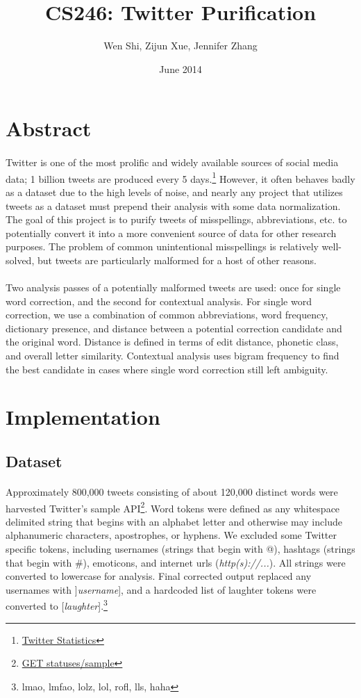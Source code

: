 \documentclass[twocolumn,10pt]{article}
\title{CS246: Twitter Purification}
\author{Wen Shi, Zijun Xue, Jennifer Zhang}
\date{June 2014}
\begin{document}
\maketitle


\section*{Abstract}
\paragraph{} Twitter is one of the most prolific and widely available sources of social media data; 1 billion tweets are produced every 5 days.\footnote{\href{http://http://www.statisticbrain.com/twitter-statistics/}{Twitter Statistics}} However, it often behaves badly as a dataset due to the high levels of noise, and nearly any project that utilizes tweets as a dataset must prepend their analysis with some data normalization. The goal of this project is to purify tweets of misspellings, abbreviations, etc. to potentially convert it into a more convenient source of data for other research purposes. The problem of common unintentional misspellings is relatively well-solved, but tweets are particularly malformed for a host of other reasons.
\paragraph{} Two analysis passes of a potentially malformed tweets are used: once for single word correction, and the second for contextual analysis. For single word correction, we use a combination of common abbreviations, word frequency, dictionary presence, and distance between a potential correction candidate and the original word. Distance is defined in terms of edit distance, phonetic class, and overall letter similarity. Contextual analysis uses bigram frequency to find the best candidate in cases where single word correction still left ambiguity.
\section*{Implementation}
\subsection*{Dataset}
\paragraph{} Approximately 800,000 tweets consisting of about 120,000 distinct words were harvested Twitter's sample API\footnote{\href{https://dev.twitter.com/docs/api/1.1/get/statuses/sample}{GET statuses/sample}}. Word tokens were defined as any whitespace delimited string that begins with an alphabet letter and otherwise may include alphanumeric characters, apostrophes, or hyphens. We excluded some Twitter specific tokens, including usernames (strings that begin with @), hashtags (strings that begin with \#), emoticons, and internet urls (\textit{http(s)://...}). All strings were converted to lowercase for analysis. Final corrected output replaced any usernames with ]\textit{username}], and a hardcoded list of laughter tokens were converted to [\textit{laughter}].\footnote{lmao, lmfao, lolz, lol, rofl, lls, haha}
\end{document}
